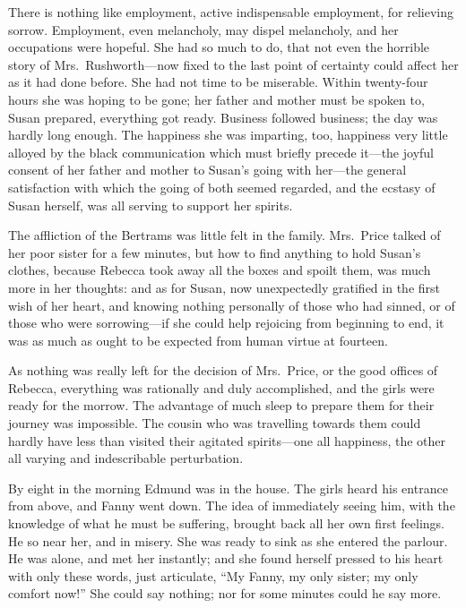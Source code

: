 \documentclass{article}
\begin{document}
There is nothing like employment, active indispensable employment,
for relieving sorrow.  Employment, even melancholy,
may dispel melancholy, and her occupations were hopeful.
She had so much to do, that not even the horrible
story of Mrs.\ Rushworth---now fixed to the last point
of certainty could affect her as it had done before.
She had not time to be miserable.  Within twenty-four
hours she was hoping to be gone; her father and mother
must be spoken to, Susan prepared, everything got ready.
Business followed business; the day was hardly long enough.
The happiness she was imparting, too, happiness very little
alloyed by the black communication which must briefly
precede it---the joyful consent of her father and mother
to Susan's going with her---the general satisfaction with
which the going of both seemed regarded, and the ecstasy
of Susan herself, was all serving to support her spirits.

The affliction of the Bertrams was little felt in the family.
Mrs.\ Price talked of her poor sister for a few minutes,
but how to find anything to hold Susan's clothes,
because Rebecca took away all the boxes and spoilt them,
was much more in her thoughts:  and as for Susan,
now unexpectedly gratified in the first wish of her heart,
and knowing nothing personally of those who had sinned,
or of those who were sorrowing---if she could help rejoicing
from beginning to end, it was as much as ought to be expected
from human virtue at fourteen.

As nothing was really left for the decision of Mrs.\ Price,
or the good offices of Rebecca, everything was rationally
and duly accomplished, and the girls were ready for
the morrow.  The advantage of much sleep to prepare
them for their journey was impossible.  The cousin
who was travelling towards them could hardly have less
than visited their agitated spirits---one all happiness,
the other all varying and indescribable perturbation.

By eight in the morning Edmund was in the house.  The girls
heard his entrance from above, and Fanny went down.
The idea of immediately seeing him, with the knowledge
of what he must be suffering, brought back all her own
first feelings.  He so near her, and in misery.  She was
ready to sink as she entered the parlour.  He was alone,
and met her instantly; and she found herself pressed
to his heart with only these words, just articulate,
``My Fanny, my only sister; my only comfort now!''
She could say nothing; nor for some minutes could he
say more.
\end{document}

